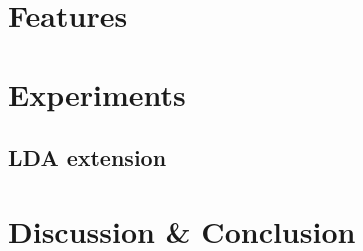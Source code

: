 \documentclass[11pt,a4paper]{article}
\begin{document}
\section{Features}
\label{sec:features}


\section{Experiments}

\subsection{LDA extension}


\section{Discussion \& Conclusion}



\appendix

{}

\end{document}
